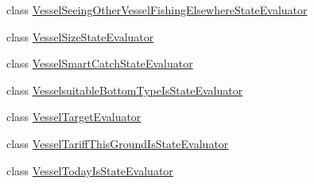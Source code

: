 \begin{DoxyCompactItemize}
\item 
class \mbox{\hyperlink{classdtree_1_1vessels_1_1_vessel_seeing_other_vessel_fishing_elsewhere_state_evaluator}{Vessel\+Seeing\+Other\+Vessel\+Fishing\+Elsewhere\+State\+Evaluator}}
\item 
class \mbox{\hyperlink{classdtree_1_1vessels_1_1_vessel_size_state_evaluator}{Vessel\+Size\+State\+Evaluator}}
\item 
class \mbox{\hyperlink{classdtree_1_1vessels_1_1_vessel_smart_catch_state_evaluator}{Vessel\+Smart\+Catch\+State\+Evaluator}}
\item 
class \mbox{\hyperlink{classdtree_1_1vessels_1_1_vesselsuitable_bottom_type_is_state_evaluator}{Vesselsuitable\+Bottom\+Type\+Is\+State\+Evaluator}}
\item 
class \mbox{\hyperlink{classdtree_1_1vessels_1_1_vessel_target_evaluator}{Vessel\+Target\+Evaluator}}
\item 
class \mbox{\hyperlink{classdtree_1_1vessels_1_1_vessel_tariff_this_ground_is_state_evaluator}{Vessel\+Tariff\+This\+Ground\+Is\+State\+Evaluator}}
\item 
class \mbox{\hyperlink{classdtree_1_1vessels_1_1_vessel_today_is_state_evaluator}{Vessel\+Today\+Is\+State\+Evaluator}}
\end{DoxyCompactItemize}

